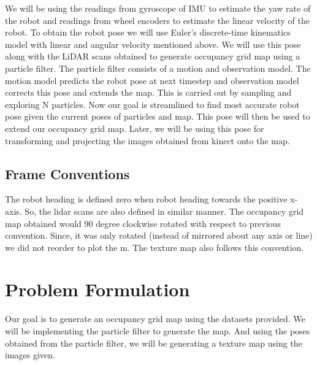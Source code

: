 \documentclass[a4paper]{article}
\begin{document}
We will be using the readings from gyroscope of IMU to estimate the yaw rate of the robot and readings from wheel encoders to estimate the linear velocity of the robot. To obtain the robot pose we will use Euler's discrete-time kinematics model with linear and angular velocity mentioned above. We will use this pose along with the LiDAR scans obtained to generate occupancy grid map using a particle filter. The particle filter consists of a motion and observation model. The motion model predicts the robot pose at next timestep and observation model corrects this pose and extends the map. This is carried out by sampling and exploring N particles. Now our goal is streamlined to find most accurate robot pose given the current poses of particles and map. This pose will then be used to extend our occupancy grid map. Later, we will be using this pose for transforming and projecting the images obtained from kinect onto the map.
\subsection{Frame Conventions}
The robot heading is defined zero when robot heading towards the positive x-axis. So, the lidar scans are also defined in similar manner. The occupancy grid map obtained would 90 degree clockwise rotated with respect to previous convention. Since, it was only rotated (instead of mirrored about any axis or line) we did not reorder to plot the m. The texture map also follows this convention.
\section{Problem Formulation}
Our goal is to generate an occupancy grid map using the datasets provided. We will be implementing the particle filter to generate the map. And using the poses obtained from the particle filter, we will be generating a texture map using the images given.
\end{document}
